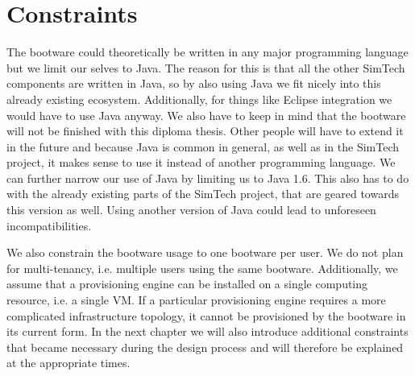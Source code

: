 \section{Constraints}

The bootware could theoretically be written in any major programming language but we limit our selves to Java.
The reason for this is that all the other SimTech components are written in Java, so by also using Java we fit nicely into this already existing ecosystem.
Additionally, for things like Eclipse integration we would have to use Java anyway.
We also have to keep in mind that the bootware will not be finished with this diploma thesis.
Other people will have to extend it in the future and because Java is common in general, as well as in the SimTech project, it makes sense to use it instead of another programming language.
We can further narrow our use of Java by limiting us to Java 1.6.
This also has to do with the already existing parts of the SimTech project, that are geared towards this version as well.
Using another version of Java could lead to unforeseen incompatibilities.

We also constrain the bootware usage to one bootware per user.
We do not plan for multi-tenancy, i.e. multiple users using the same bootware.
Additionally, we assume that a provisioning engine can be installed on a single computing resource, i.e. a single VM.
If a particular provisioning engine requires a more complicated infrastructure topology, it cannot be provisioned by the bootware in its current form.
In the next chapter we will also introduce additional constraints that became necessary during the design process and will therefore be explained at the appropriate times.
